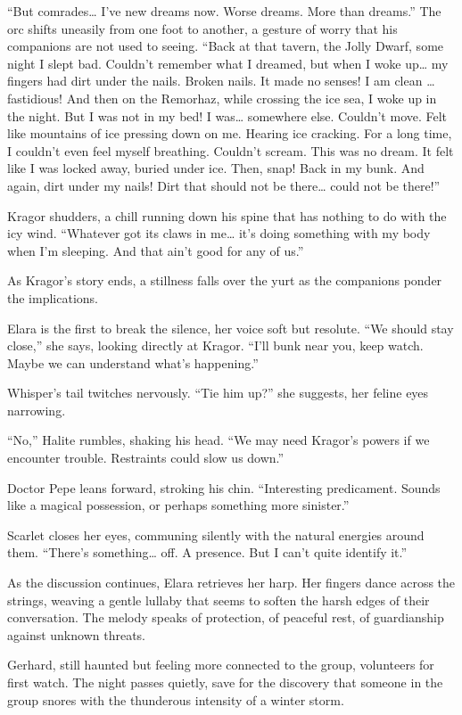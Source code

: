 \documentclass[
  letterpaper,12pt,twoside,twocolumn,openany,
  nodeprecatedcode,bg=full]{dndbook}
\begin{document}
``But comrades\ldots{} I've new dreams now. Worse dreams. More than
dreams.'' The orc shifts uneasily from one foot to another, a gesture of
worry that his companions are not used to seeing. ``Back at that tavern,
the Jolly Dwarf, some night I slept bad. Couldn't remember what I
dreamed, but when I woke up\ldots{} my fingers had dirt under the nails.
Broken nails. It made no senses! I am clean \ldots{} fastidious! And
then on the Remorhaz, while crossing the ice sea, I woke up in the
night. But I was not in my bed! I was\ldots{} somewhere else. Couldn't
move. Felt like mountains of ice pressing down on me. Hearing ice
cracking. For a long time, I couldn't even feel myself breathing.
Couldn't scream. This was no dream. It felt like I was locked away,
buried under ice. Then, snap! Back in my bunk. And again, dirt under my
nails! Dirt that should not be there\ldots{} could not be there!''

Kragor shudders, a chill running down his spine that has nothing to do
with the icy wind. ``Whatever got its claws in me\ldots{} it's doing
something with my body when I'm sleeping. And that ain't good for any of
us.''

As Kragor's story ends, a stillness falls over the yurt as the
companions ponder the implications.

Elara is the first to break the silence, her voice soft but resolute.
``We should stay close,'' she says, looking directly at Kragor. ``I'll
bunk near you, keep watch. Maybe we can understand what's happening.''

Whisper's tail twitches nervously. ``Tie him up?'' she suggests, her
feline eyes narrowing.

``No,'' Halite rumbles, shaking his head. ``We may need Kragor's powers
if we encounter trouble. Restraints could slow us down.''

Doctor Pepe leans forward, stroking his chin. ``Interesting predicament.
Sounds like a magical possession, or perhaps something more sinister.''

Scarlet closes her eyes, communing silently with the natural energies
around them. ``There's something\ldots{} off. A presence. But I can't
quite identify it.''

As the discussion continues, Elara retrieves her harp. Her fingers dance
across the strings, weaving a gentle lullaby that seems to soften the
harsh edges of their conversation. The melody speaks of protection, of
peaceful rest, of guardianship against unknown threats.

Gerhard, still haunted but feeling more connected to the group,
volunteers for first watch. The night passes quietly, save for the
discovery that someone in the group snores with the thunderous intensity
of a winter storm.
\end{document}
